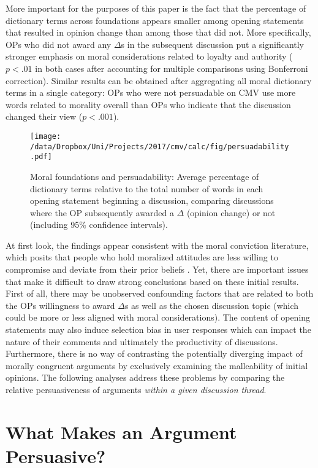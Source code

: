 More important for the purposes of this paper is the fact that the percentage of dictionary terms across foundations appears smaller among opening statements that resulted in opinion change than among those that did not. More specifically, OPs who did not award any $\Delta$s in the subsequent discussion put a significantly stronger emphasis on moral considerations related to loyalty and authority ($p<.01$ in both cases after accounting for multiple comparisons using Bonferroni correction). Similar results can be obtained after aggregating all moral dictionary terms in a single category: OPs who were not persuadable on CMV use more words related to morality overall than OPs who indicate that the discussion changed their view ($p<.001$).

\begin{figure}[ht]
\centering
\texttt{[image: /data/Dropbox/Uni/Projects/2017/cmv/calc/fig/persuadability.pdf]}
\caption[Moral foundations and persuadability]{Moral foundations and persuadability: Average percentage of dictionary terms relative to the total number of words in each opening statement beginning a discussion, comparing discussions where the OP subsequently awarded a $\Delta$ (opinion change) or not (including 95\% confidence intervals).}\label{fig:persuadability}
\end{figure}

At first look, the findings appear consistent with the moral conviction literature, which posits that people who hold moralized attitudes are less willing to compromise and deviate from their prior beliefs \citep[e.g.,][]{skitka2005moral,ryan2014reconsidering,ryan2017no}. Yet, there are important issues that make it difficult to draw strong conclusions based on these initial results. First of all, there may be unobserved confounding factors that are related to both the OPs willingness to award $\Delta$s as well as the chosen discussion topic (which could be more or less aligned with moral considerations). The content of opening statements may also induce selection bias in user responses which can impact the nature of their comments and ultimately the productivity of discussions. Furthermore, there is no way of contrasting the potentially diverging impact of morally congruent arguments by exclusively examining the malleability of initial opinions. The following analyses address these problems by comparing the relative persuasiveness of arguments \textit{within a given discussion thread}.


\clearpage
\section{What Makes an Argument Persuasive?}

